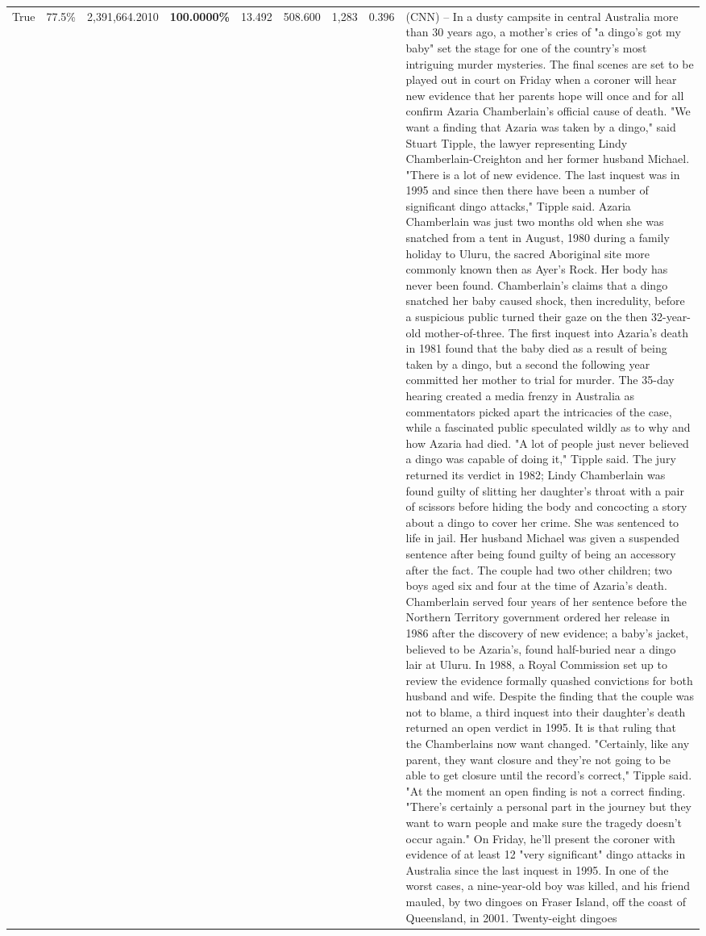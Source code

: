 \begin{table}[H]
\begin{tabular}{lllrlllll}
True & 77.5\% & 2,391,664.2010 & \bfseries \color{red} 100.0000\% & 13.492 & 508.600 & 1,283 & 0.396 & (CNN) -- In a dusty campsite in central Australia more than 30 years ago, a mother's cries of "a dingo's got my baby" set the stage for one of the country's most intriguing murder mysteries. The final scenes are set to be played out in court on Friday when a coroner will hear new evidence that her parents hope will once and for all confirm Azaria Chamberlain's official cause of death. "We want a finding that Azaria was taken by a dingo," said Stuart Tipple, the lawyer representing Lindy Chamberlain-Creighton and her former husband Michael. "There is a lot of new evidence. The last inquest was in 1995 and since then there have been a number of significant dingo attacks," Tipple said. Azaria Chamberlain was just two months old when she was snatched from a tent in August, 1980 during a family holiday to Uluru, the sacred Aboriginal site more commonly known then as Ayer's Rock. Her body has never been found. Chamberlain's claims that a dingo snatched her baby caused shock, then incredulity, before a suspicious public turned their gaze on the then 32-year-old mother-of-three. The first inquest into Azaria's death in 1981 found that the baby died as a result of being taken by a dingo, but a second the following year committed her mother to trial for murder. The 35-day hearing created a media frenzy in Australia as commentators picked apart the intricacies of the case, while a fascinated public speculated wildly as to why and how Azaria had died. "A lot of people just never believed a dingo was capable of doing it," Tipple said. The jury returned its verdict in 1982; Lindy Chamberlain was found guilty of slitting her daughter's throat with a pair of scissors before hiding the body and concocting a story about a dingo to cover her crime. She was sentenced to life in jail. Her husband Michael was given a suspended sentence after being found guilty of being an accessory after the fact. The couple had two other children; two boys aged six and four at the time of Azaria's death. Chamberlain served four years of her sentence before the Northern Territory government ordered her release in 1986 after the discovery of new evidence; a baby's jacket, believed to be Azaria's, found half-buried near a dingo lair at Uluru. In 1988, a Royal Commission set up to review the evidence formally quashed convictions for both husband and wife. Despite the finding that the couple was not to blame, a third inquest into their daughter's death returned an open verdict in 1995. It is that ruling that the Chamberlains now want changed. "Certainly, like any parent, they want closure and they're not going to be able to get closure until the record's correct," Tipple said. "At the moment an open finding is not a correct finding. "There's certainly a personal part in the journey but they want to warn people and make sure the tragedy doesn't occur again." On Friday, he'll present the coroner with evidence of at least 12 "very significant" dingo attacks in Australia since the last inquest in 1995. In one of the worst cases, a nine-year-old boy was killed, and his friend mauled, by two dingoes on Fraser Island, off the coast of Queensland, in 2001. Twenty-eight dingoes 
\end{tabular}
\end{table}
